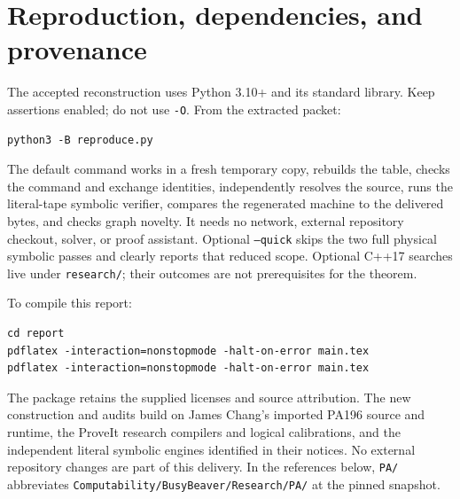 \documentclass[11pt,letterpaper]{article}
\newcommand{\file}[1]{\nolinkurl{#1}}
\begin{document}
\section{Reproduction, dependencies, and provenance}

The accepted reconstruction uses Python 3.10+ and its standard library.
Keep assertions enabled; do not use \texttt{-O}. From the extracted packet:
\begin{lstlisting}
python3 -B reproduce.py
\end{lstlisting}
The default command works in a fresh temporary copy, rebuilds the table,
checks the command and exchange identities, independently resolves the
source, runs the literal-tape symbolic verifier, compares the regenerated
machine to the delivered bytes, and checks graph novelty. It needs no
network, external repository checkout, solver, or proof assistant. Optional
\texttt{--quick} skips the two full physical symbolic passes and clearly
reports that reduced scope. Optional C++17 searches live under
\file{research/}; their outcomes are not prerequisites for the theorem.

To compile this report:
\begin{lstlisting}
cd report
pdflatex -interaction=nonstopmode -halt-on-error main.tex
pdflatex -interaction=nonstopmode -halt-on-error main.tex
\end{lstlisting}

The package retains the supplied licenses and source attribution. The new
construction and audits build on James Chang's imported PA196 source and
runtime, the ProveIt research compilers and logical calibrations, and the
independent literal symbolic engines identified in their notices.
No external repository changes are part of this delivery.
In the references below, \file{PA/} abbreviates
\file{Computability/BusyBeaver/Research/PA/} at the pinned snapshot.
\end{document}

